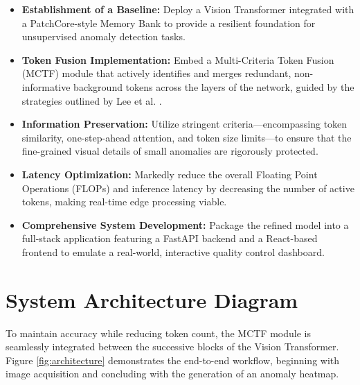 \documentclass[12pt]{article}
\begin{document}
\begin{itemize}
    \item \textbf{Establishment of a Baseline:} Deploy a Vision Transformer integrated with a PatchCore-style Memory Bank to provide a resilient foundation for unsupervised anomaly detection tasks.
    \item \textbf{Token Fusion Implementation:} Embed a Multi-Criteria Token Fusion (MCTF) module that actively identifies and merges redundant, non-informative background tokens across the layers of the network, guided by the strategies outlined by Lee et al. \cite{lee2023multi}.
    \item \textbf{Information Preservation:} Utilize stringent criteria---encompassing token similarity, one-step-ahead attention, and token size limits---to ensure that the fine-grained visual details of small anomalies are rigorously protected.
    \item \textbf{Latency Optimization:} Markedly reduce the overall Floating Point Operations (FLOPs) and inference latency by decreasing the number of active tokens, making real-time edge processing viable.
    \item \textbf{Comprehensive System Development:} Package the refined model into a full-stack application featuring a FastAPI backend and a React-based frontend to emulate a real-world, interactive quality control dashboard.
\end{itemize}

\section{System Architecture Diagram}
To maintain accuracy while reducing token count, the MCTF module is seamlessly integrated between the successive blocks of the Vision Transformer. Figure \ref{fig:architecture} demonstrates the end-to-end workflow, beginning with image acquisition and concluding with the generation of an anomaly heatmap.
\end{document}
